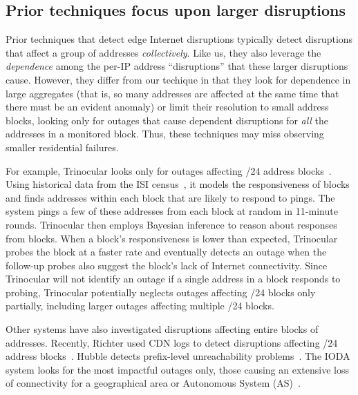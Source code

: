 
\subsection{Prior techniques focus upon larger disruptions}

Prior techniques that detect edge Internet disruptions typically detect disruptions that affect a group of
addresses \emph{collectively}. Like us, they also leverage the
\textit{dependence} among the per-IP address ``disruptions'' that
these larger disruptions cause. However, they differ from our techique in that they look for dependence in large aggregates
(that is, so many addresses are affected at the same time that there
must be an evident anomaly) or limit their resolution to small address
blocks, looking only for outages that cause dependent
disruptions for \textit{all} the addresses in a monitored block.
Thus, these techniques may miss observing smaller residential
failures. 

For example, Trinocular looks only for outages affecting
/24 address blocks~\cite{trinocular}. Using
historical data from the ISI census~\cite{census-survey}, it models
the responsiveness of blocks and finds addresses within each block
that are likely to respond to pings. The system pings a few of these
addresses from each block at random in 11-minute
rounds. Trinocular then employs Bayesian inference to reason about
responses from blocks. When a block's responsiveness is lower than
expected, Trinocular probes the block at a faster rate and eventually
detects an outage when the follow-up probes also suggest the block's
lack of Internet connectivity. Since Trinocular will not identify an
outage if a single address in a block responds to probing, Trinocular
potentially neglects outages affecting /24 blocks only partially,
including larger outages affecting multiple /24 blocks. 

Other systems have also investigated disruptions affecting entire blocks of
addresses. Recently, Richter \etal used CDN logs to
detect disruptions affecting /24 address
blocks~\cite{advancing-outage-art}. Hubble detects prefix-level
unreachability problems~\cite{hubble}. The IODA system looks for the most impactful outages
only, those causing an extensive loss of connectivity for a
geographical area or Autonomous System
(AS)~\cite{dainotti-imc11, ioda-project-page}. 

